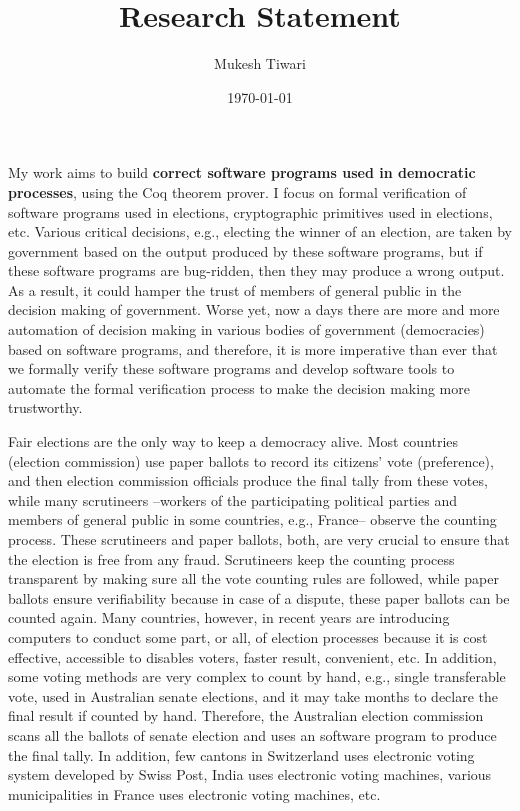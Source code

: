 \documentclass[a4paper]{article}
\title{Research Statement}
\author{Mukesh Tiwari}
\date{\today}
\begin{document}
\fontsize{12}{15}
\selectfont
\maketitle

My work aims to build \textbf{correct software programs used in democratic processes}, 
using the Coq theorem prover. 
I focus on formal verification of software programs used in elections, 
cryptographic primitives used in elections, etc.  Various 
critical decisions, e.g., electing the winner of an election, 
are taken by government based on the output produced by these software programs, but if these 
software programs are bug-ridden, then they may produce a wrong 
output. As a result, it could hamper the trust of  
members of general public in the decision making of government. 
Worse yet, now a days there are more and more automation of decision making 
in various bodies of government (democracies) based on software programs, 
and therefore, it is more imperative than ever  that  we formally verify these software programs and 
develop software tools to automate the formal verification process to make the decision making more trustworthy. 

Fair elections are the only way to keep a democracy alive. Most countries (election commission) use paper ballots to record 
its citizens' vote (preference), and then election commission officials produce the final tally from these votes, 
while many scrutineers --workers of the participating political parties and members of general public in 
some countries, e.g., France--  
observe the counting process. These scrutineers and paper ballots, both, are very crucial to ensure that 
the election is free from any fraud. Scrutineers keep the counting process transparent by making sure all the vote counting 
rules are followed, while paper ballots ensure verifiability because in case of a dispute, these paper ballots 
can be counted again. Many countries, however, in recent years are introducing computers to conduct some part, or all, of 
election processes because it is cost effective, accessible to disables voters, faster result, convenient, etc. 
In addition, some voting methods are very complex to count by hand, e.g., 
single transferable vote, used in Australian senate elections, and it may take months to declare the final result if 
counted by hand. Therefore, the Australian election commission scans all the ballots of senate election and 
uses an software program to produce the final tally. In addition, few cantons in Switzerland uses electronic 
voting system developed by Swiss Post, India uses electronic voting machines, various municipalities in France 
uses electronic voting machines, etc.
\end{document}
